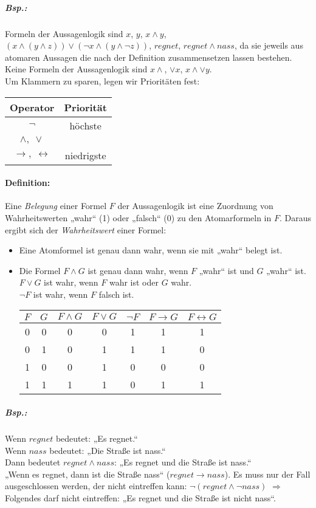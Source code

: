 \documentclass{scrreprt}
\begin{document}
\subparagraph{Bsp.:} Formeln der Aussagenlogik sind $x$, $y$, $x\wedge y$, $( x\wedge (y \wedge z)) \vee (\neg x \wedge (y \wedge \neg z))$, $regnet$, $regnet \wedge nass$, da sie jeweils aus atomaren Aussagen die nach der Definition zusammensetzen lassen bestehen.\\
Keine Formeln der Aussagenlogik sind $x\wedge$, $\vee x$, $x\wedge \vee y$.\\
Um Klammern zu sparen, legen wir Prioritäten fest:\\
\begin{tabular}{c | c}
Operator & Priorität \\
\hline
$\neg$ & höchste\\
$\wedge ,\; \vee$ & \\
$\rightarrow , \; \leftrightarrow$ & niedrigste\\
\end{tabular}

\paragraph{Definition:} Eine \emph{Belegung} einer Formel $F$ der Aussagenlogik ist eine Zuordnung von Wahrheitswerten „wahr“ (1) oder „falsch“ (0) zu den Atomarformeln in $F$.
Daraus ergibt sich der \emph{Wahrheitswert} einer Formel:
\begin{itemize}
\item Eine Atomformel ist genau dann wahr, wenn sie mit „wahr“ belegt ist.
\item Die Formel $F\wedge G $ ist genau dann wahr, wenn $F$ „wahr“ ist und $G$ „wahr“ ist. \\
$F\vee G$ ist wahr, wenn $F$ wahr ist oder $G$ wahr.\\
$\neg F$ ist wahr, wenn $F$ falsch ist.\\
\begin{tabular}{c c | c c c c c}
$F$&$G$&$F\wedge G$&$F\vee G$&$\neg F$&$F\rightarrow G$& $F\leftrightarrow G$\\
\hline
0&0&0&0&1&1&1\\
0&1&0&1&1&1&0\\
1&0&0&1&0&0&0\\
1&1&1&1&0&1&1\\
\end{tabular}
\end{itemize}

\subparagraph{Bsp.:} Wenn $regnet$ bedeutet: „Es regnet.“\\
Wenn $nass$ bedeutet: „Die Straße ist nass.“\\
Dann bedeutet $regnet \wedge nass$: „Es regnet und die Straße ist nass.“\\
„Wenn es regnet, dann ist die Straße nass“ ($regnet \rightarrow nass$). Es muss nur der Fall ausgeschlossen werden, der nicht eintreffen kann: $\neg (regnet \wedge \neg nass)$ $\Rightarrow$ Folgendes darf nicht eintreffen: „Es regnet und die Straße ist nicht nass“. 
\end{document}
